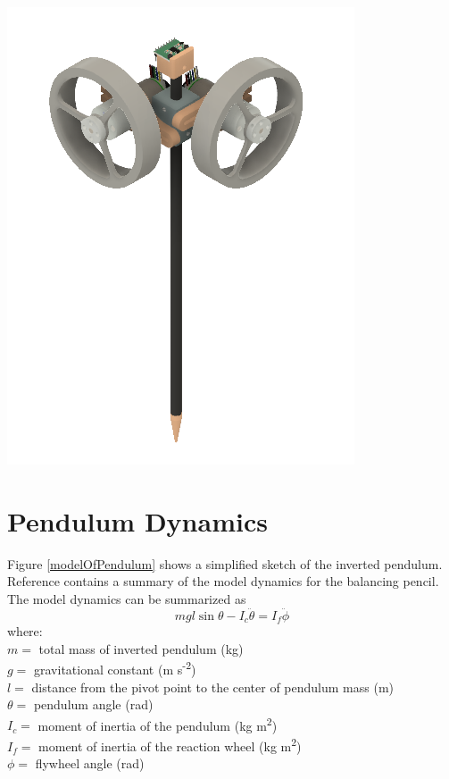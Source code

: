 \documentclass[12pt,letterpaper]{article}
\begin{document}
\includegraphics[width=\textwidth]{images/pencil.png} 
    \label{sketchOfPendulum}





\section{Pendulum Dynamics}

Figure \ref{modelOfPendulum} shows a simplified sketch of the inverted pendulum.
Reference \cite{reactionWheel} contains a summary of the model dynamics for the balancing pencil.  
The model dynamics can be summarized as
%
\begin{equation}
    m g l \sin \theta - I_{c}\ddot{\theta}  = I_{f}\ddot{\phi}
\end{equation}
%
where: \\
$ m =$ total mass of inverted pendulum (kg)\\
$g =$ gravitational constant  (m s\textsuperscript{-2}) \\
$l =$ distance from the pivot point to the center of pendulum mass (m)\\
$\theta =$ pendulum angle (rad) \\
$I_{c} =$ moment of inertia of the pendulum (kg m\textsuperscript{2}) \\
$I_{f} =$ moment of inertia of the reaction wheel (kg m\textsuperscript{2}) \\
$\phi =$ flywheel angle (rad) \\
\end{document}
